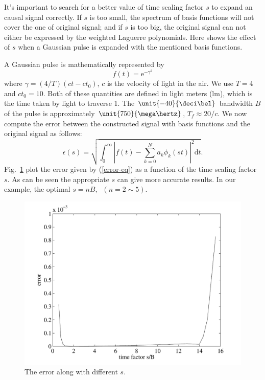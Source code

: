 \documentclass[conference, a4paper]{IEEEtran}
\begin{document}
It's important to search for a better value of time scaling factor $s$ to
expand an causal signal correctly. If $s$ is too small, the spectrum of
basis functions will not cover the one of original signal; and if $s$ is
too big, the original signal can not either be expressed by the weighted
Laguerre polynomials. Here shows the effect of $s$ when a Gaussian pulse
is expanded with the mentioned basis functions.

A Gaussian pulse is mathematically represented by
\begin{equation}
f(t)=\mathrm{e}^{-\gamma^2}
\end{equation}
where $\gamma=(4/T)(ct-ct_0)$, $c$ is the velocity of light in the air.
We use $T=4$ and $ct_0=10$. Both of these quantities are defined in
light meters (lm), which is the time taken by light to traverse
\unit{1}{\meter}. The $\unit{-40}{\deci\bel}$ bandwidth $B$ of the pulse
is approximately $\unit{750}{\mega\hertz}$, $T_f\approx 20/c$. We now
compute the error between the constructed signal with basis functions
and the original signal as follows:
\begin{equation}
\epsilon(s)=\sqrt{\int_0^\infty\left | f(t)-\sum_{k=0}^N
a_k\phi_k(st)\right | ^2\mathrm{d}t}.\label{error-eq}
\end{equation}
Fig.~\ref{error} plot the error given by (\ref{error-eq}) as a function of
the time scaling factor $s$. As can be seen the appropriate $s$ can
give more accurate results. In our example, the optimal $s=nB,\;\;(n=2\sim 5)$.
\begin{figure}
    \centering
    \includegraphics[scale=.48]{error.pdf}
    \caption{The error along with different $s$.}
    \label{error}
\end{figure}
\end{document}
